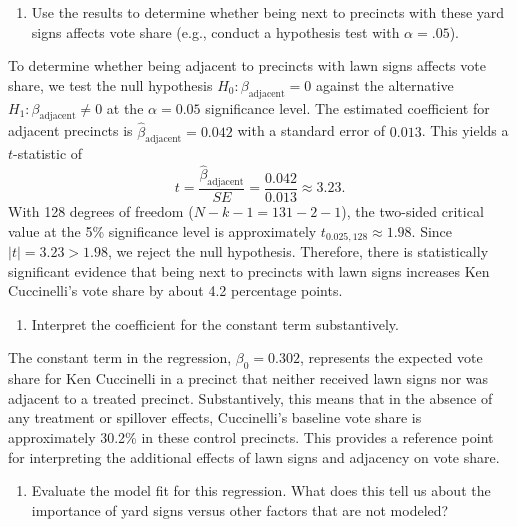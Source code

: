 \documentclass[
]{article}
\begin{document}
\vspace{.35cm}

\begin{enumerate}
	\item [(b)]
Use the results to determine whether being
next to precincts with these yard signs affects vote
share (e.g., conduct a hypothesis test with $\alpha = .05$).
\end{enumerate}

To determine whether being adjacent to precincts with lawn
signs affects vote share, we test the null hypothesis
\(H_0: \beta_{\text{adjacent}} = 0\) against the alternative
\(H_1: \beta_{\text{adjacent}} \neq 0\) at the \(\alpha = 0.05\)
significance level. The estimated coefficient for adjacent precincts is
\(\hat{\beta}_{\text{adjacent}} = 0.042\) with a standard error of
\(0.013\). This yields a \(t\)-statistic of \[
t = \frac{\hat{\beta}_{\text{adjacent}}}{SE} = \frac{0.042}{0.013} \approx 3.23.
\] With 128 degrees of freedom (\(N - k - 1 = 131 - 2 - 1\)), the
two-sided critical value at the 5\% significance level is approximately
\(t_{0.025,128} \approx 1.98\). Since \(|t| = 3.23 > 1.98\), we reject
the null hypothesis. Therefore, there is statistically significant
evidence that being next to precincts with lawn signs increases Ken
Cuccinelli's vote share by about 4.2 percentage points.

\vspace{.35cm}

\begin{enumerate}
	\item [(c)]
Interpret the coefficient for the constant term substantively.
\end{enumerate}

The constant term in the regression, \(\beta_0 = 0.302\),
represents the expected vote share for Ken Cuccinelli in a precinct that
neither received lawn signs nor was adjacent to a treated precinct.
Substantively, this means that in the absence of any treatment or
spillover effects, Cuccinelli's baseline vote share is approximately
30.2\% in these control precincts. This provides a reference point for
interpreting the additional effects of lawn signs and adjacency on vote
share.

\vspace{.35cm}

\begin{enumerate}
	\item [(d)]
Evaluate the model fit for this regression.  What does this	tell us about the importance of yard signs versus other factors that are not modeled?
\end{enumerate}
\end{document}
